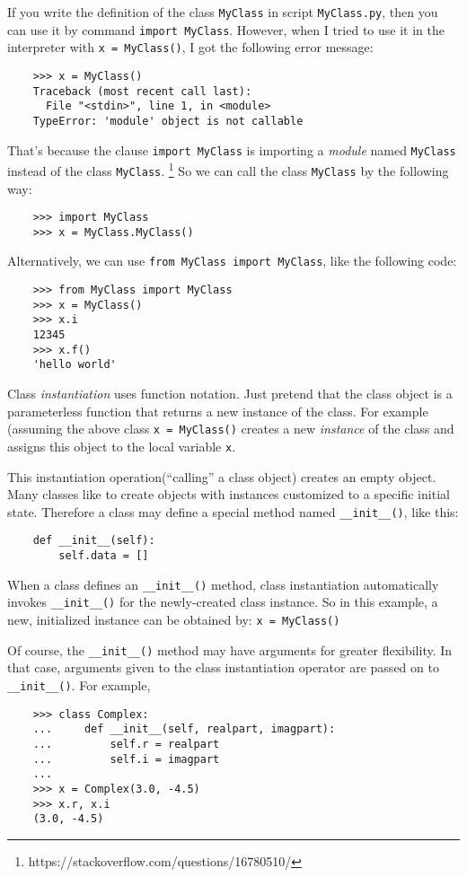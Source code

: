 \documentclass[UTF8]{article}
\begin{document}
If you write the definition of the class \texttt{MyClass} in script \texttt{MyClass.py}, then you
can use it by command \texttt{import MyClass}. However, when I tried to use it in the
interpreter with \texttt{x = MyClass()}, I got the following error message:
\begin{verbatim}
    >>> x = MyClass()
    Traceback (most recent call last):
      File "<stdin>", line 1, in <module>
    TypeError: 'module' object is not callable
\end{verbatim}

That's because the clause \texttt{import MyClass} is importing a \emph{module} named
\texttt{MyClass} instead of the class \texttt{MyClass}.
\footnote{https://stackoverflow.com/questions/16780510/} So we can call the class \texttt{MyClass}
by the following way:
\begin{verbatim}
    >>> import MyClass
    >>> x = MyClass.MyClass()
\end{verbatim}

Alternatively, we can use \texttt{from MyClass import MyClass}, like the following code:
\begin{verbatim}
    >>> from MyClass import MyClass
    >>> x = MyClass()
    >>> x.i
    12345
    >>> x.f()
    'hello world'
\end{verbatim}

Class \emph{instantiation} uses function notation. Just pretend that the class object is a
parameterless function that returns a new instance of the class. For example (assuming the above
class \texttt{x = MyClass()} creates a new \emph{instance} of the class and assigns
this object to the local variable \texttt{x}.

This instantiation operation(``calling'' a class object) creates an empty object. Many classes like
to create objects with instances customized to a specific initial state. Therefore a class may
define a special method named \texttt{\_\_init\_\_()}, like this:
\begin{verbatim}
    def __init__(self):
        self.data = []
\end{verbatim}

When a class defines an \texttt{\_\_init\_\_()} method, class instantiation automatically invokes
\texttt{\_\_init\_\_()} for the newly-created class instance. So in this example, a new,
initialized instance can be obtained by: \texttt{x = MyClass()}

Of course, the \texttt{\_\_init\_\_()} method may have arguments for greater flexibility. In that
case, arguments given to the class instantiation operator are passed on to \texttt{\_\_init\_\_()}.
For example,
\begin{verbatim}
    >>> class Complex:
    ...     def __init__(self, realpart, imagpart):
    ...         self.r = realpart
    ...         self.i = imagpart
    ...
    >>> x = Complex(3.0, -4.5)
    >>> x.r, x.i
    (3.0, -4.5)
\end{verbatim}
\end{document}
